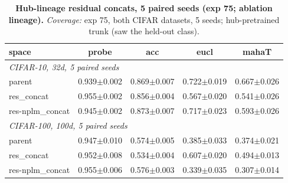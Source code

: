 \begin{table}[t]
\centering
\small
\begin{tabular}{lcccc}
\toprule
space & probe & acc & eucl & mahaT \\
\midrule
\multicolumn{5}{l}{\emph{CIFAR-10, 32d, 5 paired seeds}} \\
\quad parent & 0.939$\pm$0.002 & 0.869$\pm$0.007 & 0.722$\pm$0.019 & 0.667$\pm$0.026 \\
\quad res\_concat & 0.955$\pm$0.002 & 0.856$\pm$0.004 & 0.567$\pm$0.020 & 0.541$\pm$0.026 \\
\quad res-nplm\_concat & 0.945$\pm$0.002 & 0.873$\pm$0.007 & 0.717$\pm$0.023 & 0.593$\pm$0.026 \\
\multicolumn{5}{l}{\emph{CIFAR-100, 100d, 5 paired seeds}} \\
\quad parent & 0.947$\pm$0.010 & 0.574$\pm$0.005 & 0.385$\pm$0.033 & 0.374$\pm$0.021 \\
\quad res\_concat & 0.952$\pm$0.008 & 0.534$\pm$0.004 & 0.607$\pm$0.020 & 0.494$\pm$0.013 \\
\quad res-nplm\_concat & 0.955$\pm$0.006 & 0.576$\pm$0.003 & 0.339$\pm$0.035 & 0.307$\pm$0.014 \\
\bottomrule
\end{tabular}
\caption{\textbf{Hub-lineage residual concats, 5 paired seeds (exp 75; ablation lineage).} \emph{Coverage:} exp 75, both CIFAR datasets, 5 seeds; hub-pretrained trunk (saw the held-out class).}
\label{tab:app_hub_residual_seeds}
\end{table}

